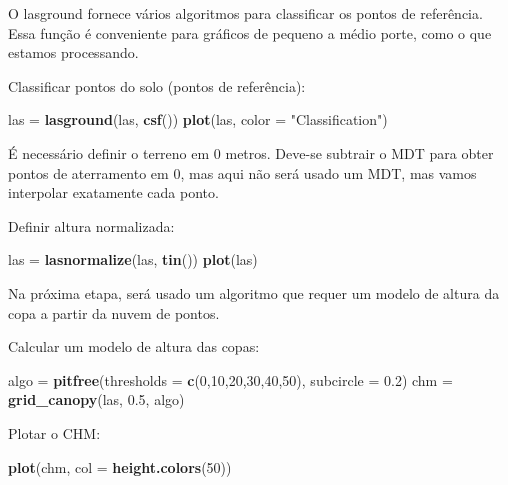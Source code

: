 \documentclass[
]{book}
\newenvironment{Shaded}{\begin{snugshade}}{\end{snugshade}}
\newcommand{\DataTypeTok}[1]{\textcolor[rgb]{0.13,0.29,0.53}{#1}}
\newcommand{\DecValTok}[1]{\textcolor[rgb]{0.00,0.00,0.81}{#1}}
\newcommand{\FloatTok}[1]{\textcolor[rgb]{0.00,0.00,0.81}{#1}}
\newcommand{\KeywordTok}[1]{\textcolor[rgb]{0.13,0.29,0.53}{\textbf{#1}}}
\newcommand{\NormalTok}[1]{#1}
\newcommand{\StringTok}[1]{\textcolor[rgb]{0.31,0.60,0.02}{#1}}
\begin{document}
O lasground fornece vários algoritmos para classificar os pontos de referência. Essa função é conveniente para gráficos de pequeno a médio porte, como o que estamos processando.

Classificar pontos do solo (pontos de referência):

\begin{Shaded}
\begin{Highlighting}[]
\NormalTok{las =}\StringTok{ }\KeywordTok{lasground}\NormalTok{(las, }\KeywordTok{csf}\NormalTok{())}
\KeywordTok{plot}\NormalTok{(las, }\DataTypeTok{color =} \StringTok{"Classification"}\NormalTok{)}
\end{Highlighting}
\end{Shaded}

É necessário definir o terreno em 0 metros. Deve-se subtrair o MDT para obter pontos de aterramento em 0, mas aqui não será usado um MDT, mas vamos interpolar exatamente cada ponto.

Definir altura normalizada:

\begin{Shaded}
\begin{Highlighting}[]
\NormalTok{las =}\StringTok{ }\KeywordTok{lasnormalize}\NormalTok{(las, }\KeywordTok{tin}\NormalTok{())}
\KeywordTok{plot}\NormalTok{(las)}
\end{Highlighting}
\end{Shaded}

Na próxima etapa, será usado um algoritmo que requer um modelo de altura da copa a partir da nuvem de pontos.

Calcular um modelo de altura das copas:

\begin{Shaded}
\begin{Highlighting}[]
\NormalTok{algo =}\StringTok{ }\KeywordTok{pitfree}\NormalTok{(}\DataTypeTok{thresholds =} \KeywordTok{c}\NormalTok{(}\DecValTok{0}\NormalTok{,}\DecValTok{10}\NormalTok{,}\DecValTok{20}\NormalTok{,}\DecValTok{30}\NormalTok{,}\DecValTok{40}\NormalTok{,}\DecValTok{50}\NormalTok{), }\DataTypeTok{subcircle =} \FloatTok{0.2}\NormalTok{)}
\NormalTok{chm  =}\StringTok{ }\KeywordTok{grid_canopy}\NormalTok{(las, }\FloatTok{0.5}\NormalTok{, algo)}
\end{Highlighting}
\end{Shaded}

Plotar o CHM:

\begin{Shaded}
\begin{Highlighting}[]
\KeywordTok{plot}\NormalTok{(chm, }\DataTypeTok{col =} \KeywordTok{height.colors}\NormalTok{(}\DecValTok{50}\NormalTok{))}
\end{Highlighting}
\end{Shaded}
\end{document}
